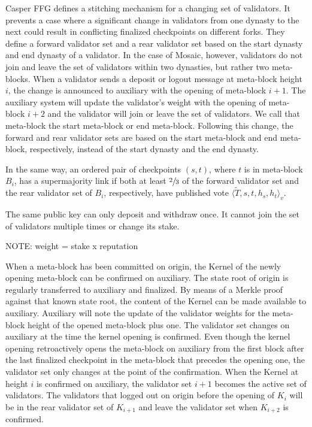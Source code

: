 \documentclass[12pt,a4paper]{article}
\begin{document}
Casper FFG\cite{casperffg} defines a stitching mechanism for a changing set of validators.
It prevents a case where a significant change in validators from one dynasty to the next could result in conflicting finalized checkpoints on different forks.
They define a forward validator set and a rear validator set based on the start dynasty and end dynasty of a validator.
In the case of Mosaic, however, validators do not join and leave the set of validators within two dynasties, but rather two meta-blocks.
When a validator sends a deposit or logout message at meta-block height $i$, the change is announced to auxiliary with the opening of meta-block $i+1$.
The auxiliary system will update the validator's weight with the opening of meta-block $i+2$ and the validator will join or leave the set of validators. We call that meta-block the start meta-block or end meta-block.
Following this change, the forward and rear validator sets are based on the start meta-block and end meta-block, respectively, instead of the start dynasty and the end dynasty.

 In the same way, an ordered pair of checkpoints $(s, t)$, where $t$ is in meta-block $B_i$, has a supermajority link if both at least $\sfrac{2}{3}$ of the forward validator set and the rear validator set of $B_i$, respectively, have published vote $\langle \tilde{T}, s, t, h_{s}, h_{t}\rangle_v$.

The same public key can only deposit and withdraw once.
It cannot join the set of validators multiple times or change its stake.

NOTE: weight = stake x reputation

When a meta-block has been committed on origin, the Kernel of the newly opening meta-block can be confirmed on auxiliary.
The state root of origin is regularly transferred to auxiliary and finalized.
By means of a Merkle proof against that known state root, the content of the Kernel can be made available to auxiliary.
Auxiliary will note the update of the validator weights for the meta-block height of the opened meta-block plus one.
The validator set changes on auxiliary at the time the kernel opening is confirmed.
Even though the kernel opening retroactively opens the meta-block on auxiliary from the first block after the last finalized checkpoint in the meta-block that precedes the opening one, the validator set only changes at the point of the confirmation.
When the Kernel at height $i$ is confirmed on auxiliary, the validator set $i+1$ becomes the active set of validators.
The validators that logged out on origin before the opening of $K_i$ will be in the rear validator set of $K_{i+1}$ and leave the validator set when $K_{i+2}$ is confirmed.
\end{document}
